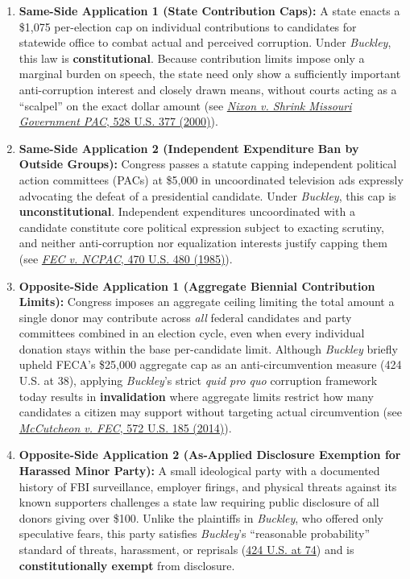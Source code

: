 \documentclass[12pt]{article}
\begin{document}
\begin{enumerate}
  \item \textbf{Same-Side Application 1 (State Contribution Caps):} A state enacts a \$1,075 per-election cap on individual contributions to candidates for statewide office to combat actual and perceived corruption. Under \textit{Buckley}, this law is \textbf{constitutional}. Because contribution limits impose only a marginal burden on speech, the state need only show a sufficiently important anti-corruption interest and closely drawn means, without courts acting as a ``scalpel'' on the exact dollar amount (see \href{https://www.oyez.org/cases/1999/98-963}{\textit{Nixon v. Shrink Missouri Government PAC}, 528 U.S. 377 (2000)}).
  \item \textbf{Same-Side Application 2 (Independent Expenditure Ban by Outside Groups):} Congress passes a statute capping independent political action committees (PACs) at \$5,000 in uncoordinated television ads expressly advocating the defeat of a presidential candidate. Under \textit{Buckley}, this cap is \textbf{unconstitutional}. Independent expenditures uncoordinated with a candidate constitute core political expression subject to exacting scrutiny, and neither anti-corruption nor equalization interests justify capping them (see \href{https://supreme.justia.com/cases/federal/us/470/480/}{\textit{FEC v. NCPAC}, 470 U.S. 480 (1985)}).
  \item \textbf{Opposite-Side Application 1 (Aggregate Biennial Contribution Limits):} Congress imposes an aggregate ceiling limiting the total amount a single donor may contribute across \textit{all} federal candidates and party committees combined in an election cycle, even when every individual donation stays within the base per-candidate limit. Although \textit{Buckley} briefly upheld FECA's \$25,000 aggregate cap as an anti-circumvention measure (424 U.S. at 38), applying \textit{Buckley}'s strict \textit{quid pro quo} corruption framework today results in \textbf{invalidation} where aggregate limits restrict how many candidates a citizen may support without targeting actual circumvention (see \href{https://www.oyez.org/cases/2013/12-536}{\textit{McCutcheon v. FEC}, 572 U.S. 185 (2014)}).
  \item \textbf{Opposite-Side Application 2 (As-Applied Disclosure Exemption for Harassed Minor Party):} A small ideological party with a documented history of FBI surveillance, employer firings, and physical threats against its known supporters challenges a state law requiring public disclosure of all donors giving over \$100. Unlike the plaintiffs in \textit{Buckley}, who offered only speculative fears, this party satisfies \textit{Buckley}'s ``reasonable probability'' standard of threats, harassment, or reprisals (\href{https://supreme.justia.com/cases/federal/us/424/1/}{424 U.S. at 74}) and is \textbf{constitutionally exempt} from disclosure.

\end{enumerate}
\end{document}
